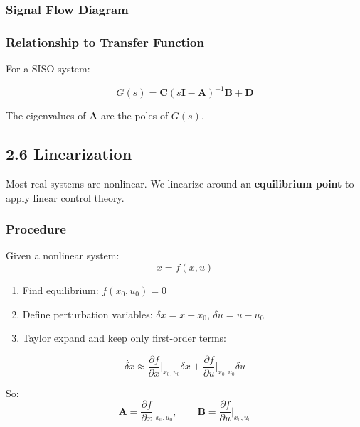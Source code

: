 \documentclass[11pt,a4paper]{book}
\begin{document}
\subsubsection{Signal Flow Diagram}

\subsubsection{Relationship to Transfer Function}

For a SISO system:

\[G(s) = \mathbf{C}(s\mathbf{I} - \mathbf{A})^{-1}\mathbf{B} + \mathbf{D}\]

The eigenvalues of $\mathbf{A}$ are the poles of $G(s)$.

\medskip\noindent\hrulefill\medskip

\subsection{2.6 Linearization}

Most real systems are nonlinear. We linearize around an \textbf{equilibrium point} to apply linear control theory.

\subsubsection{Procedure}

Given a nonlinear system:
\[\dot{x} = f(x, u)\]

\begin{enumerate}
\item Find equilibrium: $f(x_0, u_0) = 0$
\item Define perturbation variables: $\delta x = x - x_0$, $\delta u = u - u_0$
\item Taylor expand and keep only first-order terms:
\end{enumerate}

\[\dot{\delta x} \approx \frac{\partial f}{\partial x}\bigg|_{x_0, u_0} \delta x + \frac{\partial f}{\partial u}\bigg|_{x_0, u_0} \delta u\]

So:
\[\mathbf{A} = \frac{\partial f}{\partial x}\bigg|_{x_0, u_0}, \qquad \mathbf{B} = \frac{\partial f}{\partial u}\bigg|_{x_0, u_0}\]
\end{document}
